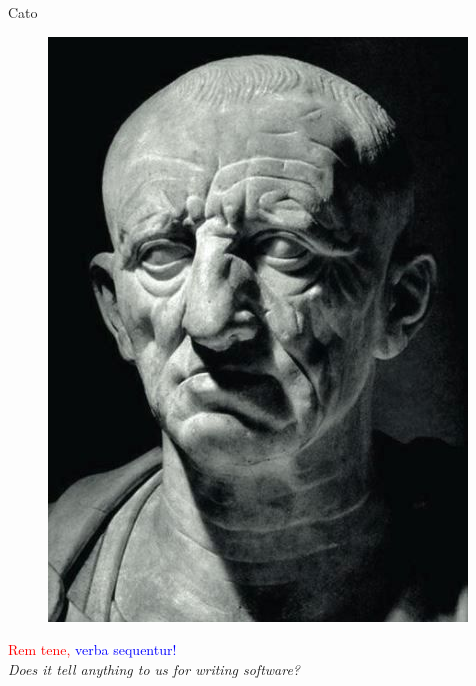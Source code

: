 \documentclass{beamer}
\begin{document}
\begin{frame}
{\centerline{Cato}}

\begin{figure}[htp]
    \centering
     \includegraphics[width=.32\textwidth]{P2023.AIBCCSS.StoryTelling/CatoneIlCensore.jpg}
    \label{F:CatoneIlCensore}
\end{figure}

\begin{center}
    \Large{\textcolor{red}{Rem tene,} \textcolor{blue}{verba sequentur!}}\\
    \textit{Does it tell anything to us for writing software?}
\end{center}
\end{frame}



\end{document}
